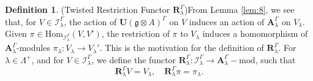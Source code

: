\documentclass[11pt]{amsart}
\theoremstyle{plain}
\theoremstyle{definition}
\newtheorem{defn}[thm]{Definition}
\newcommand{\g}{\mathfrak{g}}
\newcommand{\A}{\mathbf{A}_{\lambda}^{\Gamma}}
\begin{document}
\begin{defn}(Twisted Restriction Functor $\mathbf{R}_{\lambda}^{\Gamma}$)\label{def:6}
From Lemma \ref{lem:8}, we see that, for $V\in\mathcal{I}_{\lambda}^{\Gamma}$, the action of $\mathbf{U}(\g\otimes A)^{\Gamma}$ on $V$ induces an action of $\A$ on $V_{\lambda}$. Given $\pi\in \mathrm{Hom}_{\mathcal{I}_{\lambda}^{\Gamma}}(V,V')$, the restriction of $\pi$ to $V_{\lambda}$ induces a homomorphism of $\A$-modules $\pi_{\lambda}:V_{\lambda}\rightarrow V_{\lambda}'$. This is the motivation for the definition of $\mathbf{R}_{\lambda}^{\Gamma}$. For $\lambda\in\Lambda^{+}$, and for $V\in\mathcal{I}_{\lambda}^{\Gamma}$, we define the functor $\mathbf{R}_{\lambda}^{\Gamma}:\mathcal{I}_{\lambda}^{\Gamma}\rightarrow\A-\mathrm{mod}$, such that
\begin{equation*}
 \mathbf{R}_{\lambda}^{\Gamma}V=V_{\lambda}, \quad \mathbf{R}_{\lambda}^{\Gamma}\pi=\pi_{\lambda}.
\end{equation*}
\end{defn}
\end{document}
